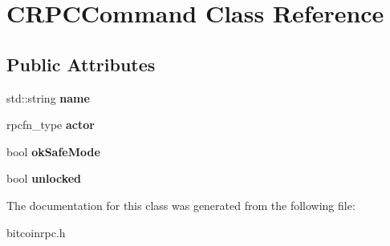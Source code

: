 \hypertarget{class_c_r_p_c_command}{}\section{C\+R\+P\+C\+Command Class Reference}
\label{class_c_r_p_c_command}
\subsection*{Public Attributes}
\begin{DoxyCompactItemize}
\item 
\mbox{\label{class_c_r_p_c_command_a8da584c0d2d98be22ebff74d3cf2221c}} 
std\+::string {\bfseries name}
\item 
\mbox{\label{class_c_r_p_c_command_a197a7eba565b4d9673537655fcbc1344}} 
rpcfn\+\_\+type {\bfseries actor}
\item 
\mbox{\label{class_c_r_p_c_command_a7f0b10e619917a3019f36ba5fa538adb}} 
bool {\bfseries ok\+Safe\+Mode}
\item 
\mbox{\label{class_c_r_p_c_command_a1f3825e7a5947f493f2f4f9983467acb}} 
bool {\bfseries unlocked}
\end{DoxyCompactItemize}


The documentation for this class was generated from the following file\+:\begin{DoxyCompactItemize}
\item 
bitcoinrpc.\+h\end{DoxyCompactItemize}
